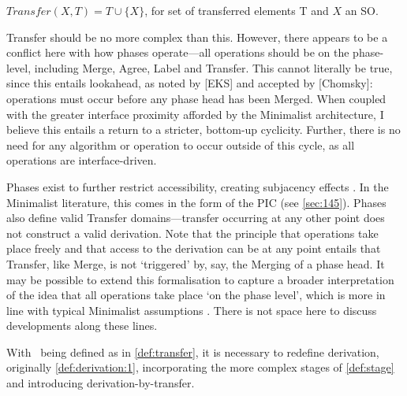 \begin{definition}\label{def:transfer}
    $Transfer(X, T) = T \cup \{X\}$, for set of transferred elements T and $X$ an SO.
\end{definition}

Transfer should be no more complex than this. However, there appears to be a conflict here with how phases operate---all operations should be on the phase-level, including Merge, Agree, Label and Transfer. This cannot literally be true, since this entails lookahead, as noted by [EKS] and accepted by [Chomsky]: operations must occur before any phase head has been Merged. When coupled with the greater interface proximity afforded by the Minimalist architecture, I believe this entails a return to a stricter, bottom-up cyclicity. Further, there is no need for any algorithm or operation to occur outside of this cycle, as all operations are interface-driven.

Phases exist to further restrict accessibility, creating subjacency effects \parencite{ChomskyN_1973}. In the Minimalist literature, this comes in the form of the PIC (see \autoref{sec:145}). Phases also define valid Transfer domains---transfer occurring at any other point does not construct a valid derivation. Note that the principle that operations take place freely and that access to the derivation can be at any point \parencite{ChomskyN_2021} entails that Transfer, like Merge, is not `triggered' by, say, the Merging of a phase head. It may be possible to extend this formalisation to capture a broader interpretation of the idea that all operations take place `on the phase level', which is more in line with typical Minimalist assumptions \parencite[cf.][]{AdgerD.RobertsI_}. There is not space here to discuss developments along these lines.

With \Transfer\ being defined as in \autoref{def:transfer}, it is necessary to redefine derivation, originally \autoref{def:derivation:1}, incorporating the more complex stages of \autoref{def:stage} and introducing derivation-by-transfer.

